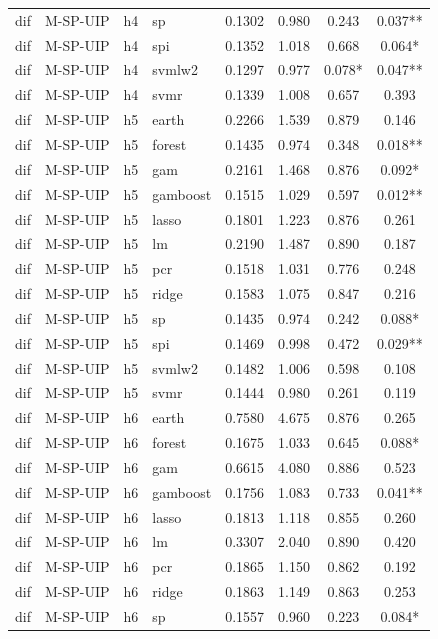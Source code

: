 \begin{ThreePartTable}
\begin{longtable}[t]{llclcccc}
dif & M-SP-UIP & h4 & sp & 0.1302 & 0.980 & 0.243 & 0.037**\\
dif & M-SP-UIP & h4 & spi & 0.1352 & 1.018 & 0.668 & 0.064*\\
dif & M-SP-UIP & h4 & svmlw2 & 0.1297 & 0.977 & 0.078* & 0.047**\\
dif & M-SP-UIP & h4 & svmr & 0.1339 & 1.008 & 0.657 & 0.393\\
\addlinespace
dif & M-SP-UIP & h5 & earth & 0.2266 & 1.539 & 0.879 & 0.146\\
dif & M-SP-UIP & h5 & forest & 0.1435 & 0.974 & 0.348 & 0.018**\\
dif & M-SP-UIP & h5 & gam & 0.2161 & 1.468 & 0.876 & 0.092*\\
dif & M-SP-UIP & h5 & gamboost & 0.1515 & 1.029 & 0.597 & 0.012**\\
dif & M-SP-UIP & h5 & lasso & 0.1801 & 1.223 & 0.876 & 0.261\\
dif & M-SP-UIP & h5 & lm & 0.2190 & 1.487 & 0.890 & 0.187\\
dif & M-SP-UIP & h5 & pcr & 0.1518 & 1.031 & 0.776 & 0.248\\
dif & M-SP-UIP & h5 & ridge & 0.1583 & 1.075 & 0.847 & 0.216\\
dif & M-SP-UIP & h5 & sp & 0.1435 & 0.974 & 0.242 & 0.088*\\
dif & M-SP-UIP & h5 & spi & 0.1469 & 0.998 & 0.472 & 0.029**\\
dif & M-SP-UIP & h5 & svmlw2 & 0.1482 & 1.006 & 0.598 & 0.108\\
dif & M-SP-UIP & h5 & svmr & 0.1444 & 0.980 & 0.261 & 0.119\\
\addlinespace
dif & M-SP-UIP & h6 & earth & 0.7580 & 4.675 & 0.876 & 0.265\\
dif & M-SP-UIP & h6 & forest & 0.1675 & 1.033 & 0.645 & 0.088*\\
dif & M-SP-UIP & h6 & gam & 0.6615 & 4.080 & 0.886 & 0.523\\
dif & M-SP-UIP & h6 & gamboost & 0.1756 & 1.083 & 0.733 & 0.041**\\
dif & M-SP-UIP & h6 & lasso & 0.1813 & 1.118 & 0.855 & 0.260\\
dif & M-SP-UIP & h6 & lm & 0.3307 & 2.040 & 0.890 & 0.420\\
dif & M-SP-UIP & h6 & pcr & 0.1865 & 1.150 & 0.862 & 0.192\\
dif & M-SP-UIP & h6 & ridge & 0.1863 & 1.149 & 0.863 & 0.253\\
dif & M-SP-UIP & h6 & sp & 0.1557 & 0.960 & 0.223 & 0.084*\\

\end{longtable}
\end{ThreePartTable}
